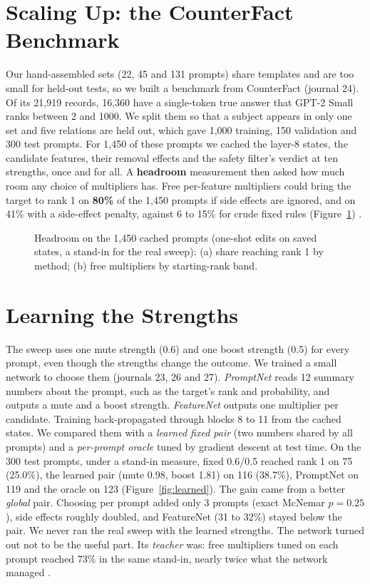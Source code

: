 \section{Scaling Up: the CounterFact Benchmark}\label{sec:scale}

Our hand-assembled sets (22, 45 and 131 prompts) share templates and are too small for held-out tests, so we built a benchmark from CounterFact (journal 24). Of its 21,919 records, 16,360 have a single-token true answer that GPT-2 Small ranks between 2 and 1000. We split them so that a subject appears in only one set and five relations are held out, which gave 1,000 training, 150 validation and 300 test prompts. For 1,450 of these prompts we cached the layer-8 states, the candidate features, their removal effects and the safety filter's verdict at ten strengths, once and for all. A \textbf{headroom} measurement then asked how much room any choice of multipliers has. Free per-feature multipliers could bring the target to rank 1 on \textbf{80\%} of the 1,450 prompts if side effects are ignored, and on 41\% with a side-effect penalty, against 6 to 15\% for crude fixed rules (Figure~\ref{fig:headroom}) \cite{p10}.

\begin{figure}[!htb]
\centering
{}
\caption{Headroom on the 1,450 cached prompts (one-shot edits on saved states, a stand-in for the real sweep): (a) share reaching rank 1 by method; (b) free multipliers by starting-rank band.}\label{fig:headroom}
\end{figure}

\section{Learning the Strengths}\label{sec:learned}

The sweep uses one mute strength (0.6) and one boost strength (0.5) for every prompt, even though the strengths change the outcome. We trained a small network to choose them (journals 23, 26 and 27). \emph{PromptNet} reads 12 summary numbers about the prompt, such as the target's rank and probability, and outputs a mute and a boost strength. \emph{FeatureNet} outputs one multiplier per candidate. Training back-propagated through blocks 8 to 11 from the cached states. We compared them with a \emph{learned fixed pair} (two numbers shared by all prompts) and a \emph{per-prompt oracle} tuned by gradient descent at test time. On the 300 test prompts, under a stand-in measure, fixed 0.6/0.5 reached rank 1 on 75 (25.0\%), the learned pair (mute 0.98, boost 1.81) on 116 (38.7\%), PromptNet on 119 and the oracle on 123 (Figure~\ref{fig:learned}). The gain came from a better \emph{global} pair. Choosing per prompt added only 3 prompts (exact McNemar $p=0.25$), side effects roughly doubled, and FeatureNet (31 to 32\%) stayed below the pair. We never ran the real sweep with the learned strengths. The network turned out not to be the useful part. Its \emph{teacher} was: free multipliers tuned on each prompt reached 73\% in the same stand-in, nearly twice what the network managed \cite{p12}.

